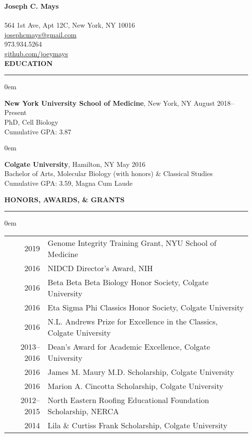 \documentclass[11pt, letterpaper]{article}
\newenvironment{CVSection}{
\begin{addmargin}[2em]{0em}
\begin{samepage}}
{\end{samepage}
\end{addmargin}\bigskip}
\newcommand{\CVHeading}[1]{
\MakeUppercase{\bf #1}
\smallskip
\hrule
\medskip
}
\begin{document}
{\Huge\textbf{Joseph C. Mays}}\\\\
\faHome\hspace{2 mm}564 1st Ave, Apt 12C, New York, NY 10016\\
\faEnvelopeSquare\hspace{2.3 mm}\href{mailto:josephcmays+CV@gmail.com}{josephcmays@gmail.com}\\
\faPhone\hspace{2.4 mm}973.934.5264\\
\faGithub\hspace{2 mm}\href{https://github.com/joeymays}{github.com/joeymays}\\

\CVHeading{Education}
\begin{CVSection}
\textbf{New York University School of Medicine}, New York, NY \hfill August 2018--Present\\
PhD, Cell Biology\\
Cumulative GPA: 3.87
\end{CVSection}

\begin{CVSection}
\textbf{Colgate University}, Hamilton, NY \hfill May 2016\\
Bachelor of Arts, Molecular Biology (with honors) \& Classical Studies\\ 
Cumulative GPA: 3.59, Magna Cum Laude
\end{CVSection}

\CVHeading{Honors, Awards, \& Grants}
\begin{CVSection}
\begin{tabular}{r|l}
2019 & Genome Integrity Training Grant, NYU School of Medicine\\
2016 & NIDCD Director’s Award, NIH\\
2016 & Beta Beta Beta Biology Honor Society, Colgate University\\
2016 & Eta Sigma Phi Classics Honor Society, Colgate University\\
2016 & N.L. Andrews Prize for Excellence in the Classics, Colgate University\\
2013--2016 & Dean’s Award for Academic Excellence, Colgate University\\
2016 & James M. Maury M.D. Scholarship, Colgate University\\
2016 & Marion A. Cincotta Scholarship, Colgate University\\
2012--2015 & North Eastern Roofing Educational Foundation Scholarship, NERCA\\
2014 & Lila \& Curtiss Frank Scholarship, Colgate University
\end{tabular}
\end{CVSection}
\end{document}
